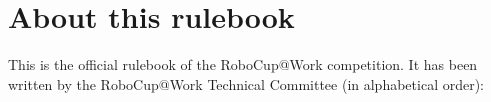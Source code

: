 
\section*{About this rulebook}
This is the official rulebook of the RoboCup@Work competition.
It has been written by the RoboCup@Work Technical Committee (in alphabetical order): 


